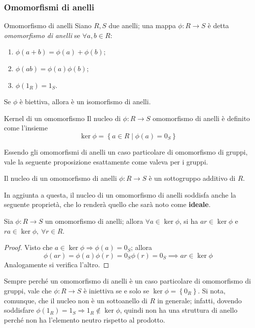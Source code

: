 \documentclass[11pt, a4paper]{scrartcl}
\theoremstyle{definition}
\numberwithin{esempio}{section}
\theoremstyle{definition}
\numberwithin{obs}{section}
\numberwithin{nota}{section}
\numberwithin{equation}{subsection}
\begin{document}
\subsubsection{Omomorfismi di anelli}
\begin{definizione}
	{Omomorfismo di anelli}{}
	Siano $R,S$ due anelli; una mappa $\phi :R \to S$ \`e detta \textit{omomorfismo di anelli} se $\forall a,b \in R$:
	\begin{enumerate}[(or 1).]
		\item $\phi (a+b) = \phi (a) + \phi (b)$;
		\item $\phi (ab) = \phi (a)\phi (b)$;
		\item $\phi (1_R) = 1_S$.
	\end{enumerate}
	Se $\phi $ \`e biettiva, allora \`e un isomorfismo di anelli.
\end{definizione}
\begin{definizione}
	{Kernel di un omomorfismo}{}
	Il nucleo di $\phi :R\to S$ omomorfismo di anelli \`e definito come l'insieme
	\[
	\operatorname{ker} \phi = \left\{ a \in R  \mid \phi (a) = 0 _S \right\} 
	\] 
\end{definizione}
\noindent Essendo gli omomorfismi di anelli un caso particolare di omomorfismo di gruppi, vale la seguente proposizione esattamente come valeva per i gruppi.
\begin{prop}
	{}{}
	Il nucleo di un omomorfismo di anelli $\phi : R\to S$ \`e un sottogruppo additivo di $R$.
\end{prop}
\noindent In aggiunta a questa, il nucleo di un omomorfismo di anelli soddisfa anche la seguente propriet\`a, che lo render\`a quello che sar\`a noto come \textbf{ideale}.
\begin{prop}
	{}{}
	Sia $\phi :R \to S$ un omomorfismo di anelli; allora $\forall a \in \operatorname{ker} \phi $, si ha $ar \in \operatorname{ker} \phi $ e $ra \in \operatorname{ker} \phi , \ \forall r \in R$.
	\begin{proof}
		Visto che $a \in \operatorname{ker} \phi \Rightarrow \phi (a) = 0_S$; allora 
		\[
		\phi (ar) = \phi (a) \phi (r) = 0_S \phi (r) = 0_S \implies ar \in \operatorname{ker} \phi 
		\] 
		Analogamente si verifica l'altro.
	\end{proof}
\end{prop}
\noindent Sempre perch\'e un omomorfismo di anelli \`e un caso particolare di omomorfismo di gruppi, vale che $\phi:R\to S $ \`e iniettiva se e solo se $\operatorname{ker} \phi  = \left\{ 0_R \right\} $.
Si nota, comunque, che il nucleo non \`e un sottoanello di $R$ in generale; infatti, dovendo soddisfare $\phi (1_R) = 1_S \Rightarrow 1_R \not\in \operatorname{ker} \phi $, quindi non ha una struttura di anello perch\'e non ha l'elemento neutro rispetto al prodotto.
\end{document}
